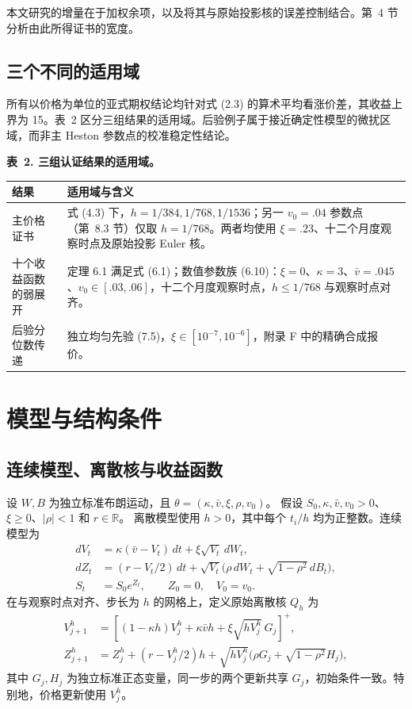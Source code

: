 本文研究的增量在于加权余项，以及将其与原始投影核的误差控制结合。第~4 节分析由此所得证书的宽度。

\subsection{三个不同的适用域}

所有以价格为单位的亚式期权结论均针对式 (2.3) 的算术平均看涨价差，其收益上界为 15。表~2 区分三组结果的适用域。后验例子属于接近确定性模型的微扰区域，而非主 Heston 参数点的校准稳定性结论。

\noindent\textbf{表~2. 三组认证结果的适用域。}
\begin{center}
\begin{tabularx}{\textwidth}{@{}l X@{}}
\toprule
结果 & 适用域与含义 \\
\midrule
主价格证书 & 式 (4.3) 下，\(h=1/384,1/768,1/1536\)；另一 \(v_0=.04\) 参数点（第~8.3 节）仅取 \(h=1/768\)。两者均使用 \(\xi=.23\)、十二个月度观察时点及原始投影 Euler 核。 \\
十个收益函数的弱展开 & 定理 6.1 满足式 (6.1)；数值参数族 (6.10)：\(\xi=0\)、\(\kappa=3\)、\(\bar v=.045\)、\(v_0\in[.03,.06]\)，十二个月度观察时点，\(h\le1/768\) 与观察时点对齐。 \\
后验分位数传递 & 独立均匀先验 (7.5)，\(\xi\in[10^{-7},10^{-6}]\)，附录 F 中的精确合成报价。 \\
\bottomrule
\end{tabularx}
\end{center}

\section{模型与结构条件}

\subsection{连续模型、离散核与收益函数}

设 \(W,B\) 为独立标准布朗运动，且
\(\theta=(\kappa,\bar v,\xi,\rho,v_0)\)。
假设
\(S_0,\kappa,\bar v,v_0>0\)、\(\xi\ge0\)、\(|\rho|<1\) 和 \(r\in\mathbb R\)。
离散模型使用 \(h>0\)，其中每个 \(t_i/h\) 均为正整数。连续模型为
\[
\begin{aligned}
dV_t&=\kappa(\bar v-V_t)\,dt+\xi\sqrt{V_t}\,dW_t,\\
dZ_t&=(r-V_t/2)\,dt+
\sqrt{V_t}\bigl(\rho\,dW_t+\sqrt{1-\rho^2}\,dB_t\bigr),\\
S_t&=S_0e^{Z_t},\qquad Z_0=0,\quad V_0=v_0.
\end{aligned}
\tag{2.1}
\]
在与观察时点对齐、步长为 \(h\) 的网格上，定义原始离散核 \(Q_h\) 为
\[
\begin{aligned}
V_{j+1}^h&=\left[(1-\kappa h)V_j^h+\kappa\bar v h+
\xi\sqrt{hV_j^h}\,G_j\right]^+,\\
Z_{j+1}^h&=Z_j^h+(r-V_j^h/2)h+
\sqrt{hV_j^h}\bigl(\rho G_j+\sqrt{1-\rho^2}H_j\bigr),
\end{aligned}
\tag{2.2}
\]
其中 \(G_j,H_j\) 为独立标准正态变量，同一步的两个更新共享 \(G_j\)，初始条件一致。特别地，价格更新使用 \(V_j^h\)。

